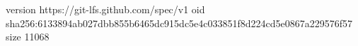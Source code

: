 version https://git-lfs.github.com/spec/v1
oid sha256:6133894ab027dbb855b6465dc915dc5e4c033851f8d224cd5e0867a229576f57
size 11068

